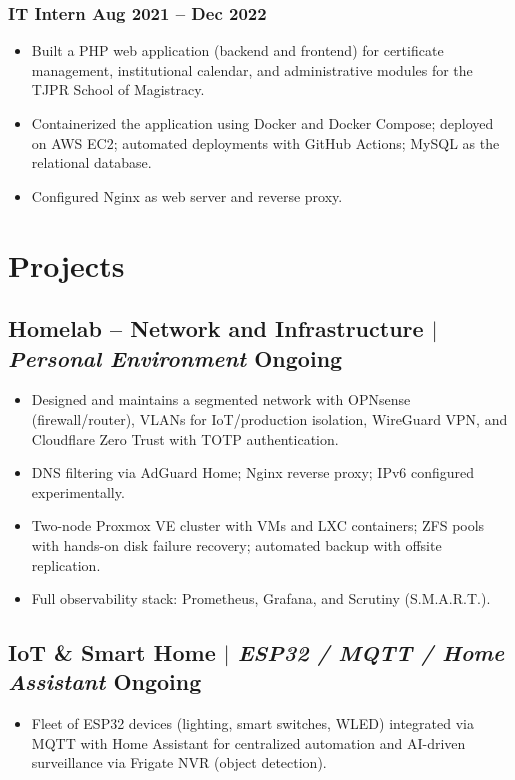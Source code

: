 \documentclass[11pt]{article}
\begin{document}
\subsubsection{IT Intern \hfill Aug 2021 -- Dec 2022}
\begin{itemize}
    \item Built a PHP web application (backend and frontend) for certificate management, institutional
          calendar, and administrative modules for the TJPR School of Magistracy.
    \item Containerized the application using Docker and Docker Compose; deployed on AWS EC2;
          automated deployments with GitHub Actions; MySQL as the relational database.
    \item Configured Nginx as web server and reverse proxy.
\end{itemize}

\section{Projects}
\subsection{Homelab -- Network and Infrastructure $|$ \normalfont\textit{Personal Environment} \hfill Ongoing}
\begin{itemize}
    \item Designed and maintains a segmented network with OPNsense (firewall/router), VLANs for
          IoT/production isolation, WireGuard VPN, and Cloudflare Zero Trust with TOTP authentication.
    \item DNS filtering via AdGuard Home; Nginx reverse proxy; IPv6 configured experimentally.
    \item Two-node Proxmox VE cluster with VMs and LXC containers; ZFS pools with hands-on disk
          failure recovery; automated backup with offsite replication.
    \item Full observability stack: Prometheus, Grafana, and Scrutiny (S.M.A.R.T.).
\end{itemize}
\subsection{IoT \& Smart Home $|$ \normalfont\textit{ESP32 / MQTT / Home Assistant} \hfill Ongoing}
\begin{itemize}
    \item Fleet of ESP32 devices (lighting, smart switches, WLED) integrated via MQTT with Home Assistant
          for centralized automation and AI-driven surveillance via Frigate NVR (object detection).
\end{itemize}
\end{document}
